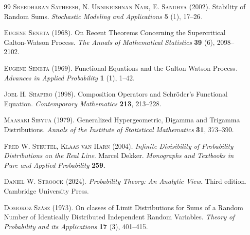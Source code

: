 \documentclass[12pt]{amsart}
\theoremstyle{remark}
\theoremstyle{definition}
\begin{document}
\begin{thebibliography}{99}
 \textsc{Sreedharan Satheesh, N. Unnikrishnan Nair, E. Sandhya} (2002). Stability of Random Sums. \textit{Stochastic Modeling and Applications} \textbf{5} (1), 17--26.

 \textsc{Eugene Seneta} (1968). On Recent Theorems Concerning the Supercritical Galton-Watson Process. \textit{The Annals of Mathematical Statistics} \textbf{39} (6), 2098--2102. 

 \textsc{Eugene Seneta} (1969). Functional Equations and the Galton-Watson Process. \textit{Advances in Applied Probability} \textbf{1} (1), 1--42. 

 \textsc{Joel H. Shapiro} (1998). Composition Operators and Schr\"oder’s Functional Equation. \textit{Contemporary Mathematics} \textbf{213}, 213–228.

 \textsc{Maasaki Sibyua} (1979). Generalized Hypergeometric, Digamma and Trigamma Distributions. \textit{Annals of the Institute of Statistical Mathematics} \textbf{31}, 373--390. 

 \textsc{Fred W. Steutel, Klaas van Harn} (2004). \textit{Infinite Divisibility of Probability Distributions on the Real Line}. Marcel Dekker. \textit{Monographs and Textbooks in Pure and Applied Probability} \textbf{259}.

 \textsc{Daniel W. Stroock} (2024). \textit{Probability Theory: An Analytic View.} Third edition. Cambridge University Press.

 \textsc{Domokoz Sz\'asz} (1973). On classes of Limit Distributions for Sums of a Random Number of Identically Distributed Independent Random Variables. \textit{Theory of Probability and its Applications} \textbf{17} (3), 401--415. 

\end{thebibliography}
\end{document}
